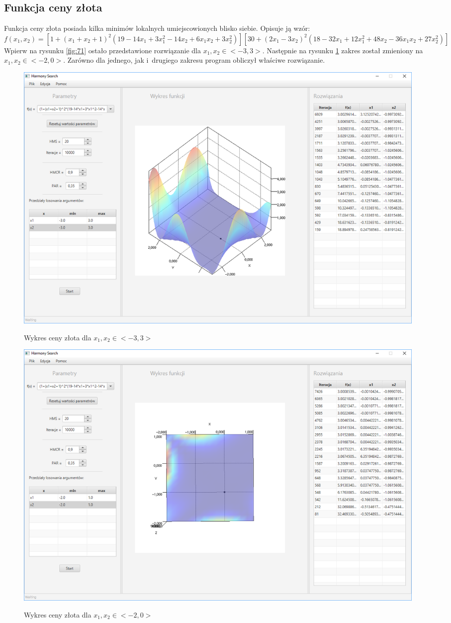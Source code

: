 \documentclass[10pt, a4paper]{article}
\begin{document}
\subsection{Funkcja ceny złota}
\label{subsec:cenyzlota}
Funkcja ceny złota posiada kilka minimów lokalnych umiejscowionych blisko siebie. Opisuje ją wzór: $$f(x_{1},x_{2}) = [1+(x_{1}+x_{2}+1)^2(19-14x_{1}+3x_{1}^2-14x_{2}+6x_{1}x_{2}+3x_{2}^2)][30+(2x_{1}-3x_{2})^2(18-32x_{1}+12x_{1}^2+48x_{2}-36x_{1}x_{2}+27x_{2}^2)]$$ Wpierw na rysunku \ref{fig:71} ostało przedstawione rozwiązanie dla  $x_{1}, x_{2} \in <-3,3>$. Następnie na rysunku \ref{fig:72} zakres został zmieniony na $x_{1}, x_{2} \in <-2,0>$. Zarówno dla jednego, jak i~drugiego zakresu program obliczył właściwe rozwiązanie. 
\begin{figure}[htbp] 
	\begin{minipage}[b]{.5\textwidth}
		\centering
		\includegraphics[width=\linewidth]{images/71.PNG}
		\label{fig:71}
		\caption{Wykres ceny złota dla \newline $x_{1},x_{2}\in<-3,3>$}
	\end{minipage} 
	\begin{minipage}[b]{.5\textwidth}
		\centering
		\includegraphics[width=\linewidth]{images/72.PNG} 
		\label{fig:72}
		\caption{Wykres ceny złota dla \newline $x_{1}, x_{2} \in <-2,0>$}
	\end{minipage}
\end{figure}
\end{document}
